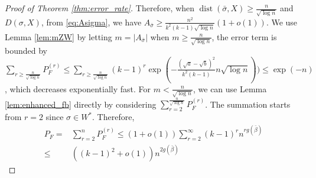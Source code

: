\documentclass[entropy,article,submit,moreauthors,pdftex]{Definitions/mdpi}
\newcommand{\1}{\mathbbm{1}}
\DeclareMathOperator{\Dist}{dist}
\begin{document}
\begin{proof}[Proof of Theorem \ref{thm:error_rate}]
Therefore, when $ \Dist(\bar{\sigma}, X) \geq \frac{n}{\sqrt{\log n} }$ and $D(\sigma, X)$,
from \eqref{eq:Asigma}, we have $A_{\bar{\sigma}} \geq \frac{n^2}{k^2(k-1)\sqrt{\log n} } (1+o(1))$.
We use Lemma \ref{lem:mZW} by letting $m=|A_{\bar{\sigma}}|$ when $m \geq \frac{n}{ \sqrt{\log n}}$, the error term is bounded
by $\sum_{r\geq \frac{n}{ \sqrt{\log n}}} P_F^{(r)} \leq \sum_{r\geq \frac{n}{ \sqrt{\log n}}} (k-1)^r \exp(-\frac{(\sqrt{a} - \sqrt{b})^2}{k^2(k-1)} n \sqrt{\log n}))
\leq \exp(-n)$, which decreases exponentially fast.
For $m < \frac{n}{ \sqrt{\log n}}$, we can use Lemma \ref{lem:enhanced_fb} directly 
by considering $\sum_{r=2}^{\frac{n}{ \sqrt{\log n}}} P_F^{(r)}$. The summation starts from $r=2$ since $\sigma \in W^*$.
Therefore,
\begin{align*}
P_F = & \sum_{r=2}^n P_F^{(r)} \leq (1+o(1)) \sum_{r=2}^{\infty} (k-1)^r n^{rg(\bar{\beta})}\\
\leq & ((k-1)^2+o(1))n^{2g(\bar{\beta})}
\end{align*}
\end{proof}


\vspace{6pt} 



\end{document}
